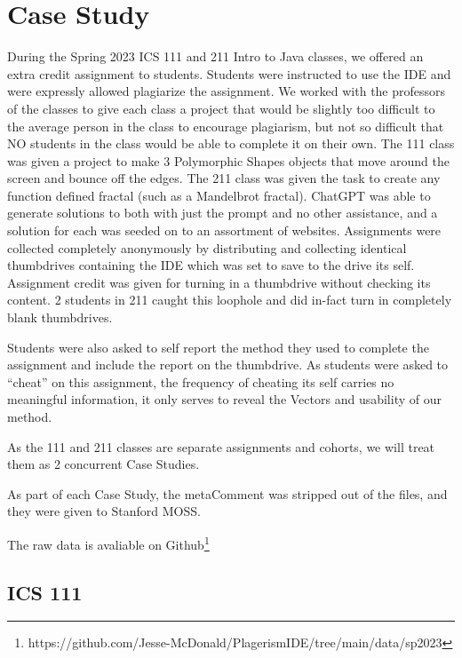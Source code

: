 \documentclass[letterpaper,10pt,conference]{IEEEtran}
\newcommand{\metaComment}{metaComment\xspace}
\begin{document}
\section{Case Study}

    \label{sec:casestudy}
During the Spring 2023 ICS 111 and 211 Intro to Java classes, we offered an extra credit assignment to students.
Students were instructed to use the IDE and were expressly allowed plagiarize the assignment.  We worked with the professors of the classes to give each class a project that would be slightly too difficult to the average person in the class to encourage plagiarism, but not so difficult that NO students in the class would be able to complete it on their own.  The 111 class was given a project to make 3 Polymorphic Shapes objects that move around the screen and bounce off the edges.  The 211 class was given the task to create any function defined fractal (such as a Mandelbrot fractal).  ChatGPT was able to generate solutions to both with just the prompt and no other assistance, and a solution for each was seeded on to an assortment of websites.  Assignments were collected completely anonymously by distributing and collecting identical thumbdrives containing the IDE which was set to save to the drive its self.  Assignment credit was given for turning in a thumbdrive without checking its content.  2 students in 211 caught this loophole and did in-fact turn in completely blank thumbdrives.

Students were also asked to self report the method they used to complete the assignment and include the report on the thumbdrive.  As students were asked to ``cheat'' on this assignment, the frequency of cheating its self carries no meaningful information, it only serves to reveal the Vectors and usability of our method.

As the 111 and 211 classes are separate assignments and cohorts, we will treat them as 2 concurrent Case Studies. 

As part of each Case Study, the \metaComment was stripped out of the files, and they were given to Stanford MOSS.

The raw data is avaliable on Github\footnote{https://github.com/Jesse-McDonald/PlagerismIDE/tree/main/data/sp2023}
\subsection{ICS 111}
    \label{sec:casestudy111}
\end{document}
